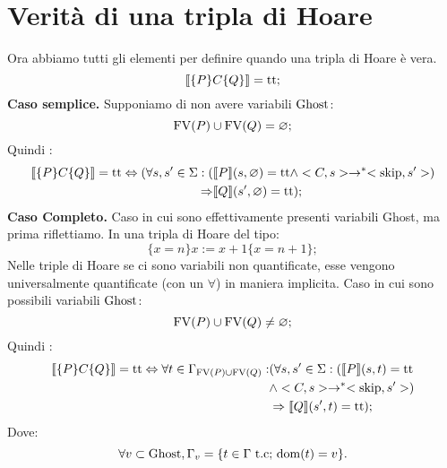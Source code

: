 \documentclass[a4paper, 12pt, oneside,fleqn]{book}
\begin{document}
\section{Verità di una tripla di Hoare}
Ora abbiamo tutti gli elementi per definire quando una tripla di Hoare è vera.
$$\llbracket \{P\}C\{Q\} \rrbracket = \mathrm{tt};$$
\textbf{Caso semplice.} Supponiamo di non avere variabili $\mathrm{Ghost}$:
$$\mathrm{FV}(P) \cup \mathrm{FV}(Q)= \varnothing;$$
Quindi :
\begin{align*}
   \llbracket \{P\} C\{Q\} \rrbracket = \mathrm{tt} \Leftrightarrow (\forall s,s'\in \Sigma \mathrel{:}(&\llbracket P \rrbracket( s,\varnothing) = \mathrm{tt}\wedge <C,s>\rightarrow ^*<\mathrm{skip},s'>)\\
\Rightarrow&\llbracket Q \rrbracket(s',\varnothing)=\mathrm{tt});
\end{align*}
\textbf{Caso Completo.} Caso in cui sono effettivamente presenti variabili Ghost, ma prima riflettiamo. In una tripla di Hoare del tipo:
$$\{x=n\}x:=x+1\{x=n+1\};$$
Nelle triple di Hoare se ci sono variabili non quantificate, esse vengono universalmente quantificate (con un $\forall$) in maniera implicita. Caso in cui sono possibili variabili $\mathrm{Ghost}$:
$$\mathrm{FV}(P) \cup \mathrm{FV}(Q) \neq \varnothing;$$
Quindi :
\begin{align*}
    \llbracket \{P\} C\{Q\} \rrbracket = \mathrm{tt} \Leftrightarrow \forall  t \in \Gamma_{\mathrm{FV}(P)\cup \mathrm{FV}(Q)}\mathrel{:} &(\forall  s,s'\in \Sigma\mathrel{:}(\llbracket P \rrbracket(s,t) = \mathrm{tt}\\
&\wedge <C,s>\rightarrow ^*<\mathrm{skip},s'>)\\
&\Rightarrow\llbracket Q \rrbracket(s',t)=\mathrm{tt});
\end{align*}
Dove:
$$\forall v \subset\mathrm{Ghost},\Gamma_{v} =\{t \in \Gamma \text{ t.c; $\mathop{\mathrm{dom}}\nolimits(t) =v$\}}.$$
\end{document}
